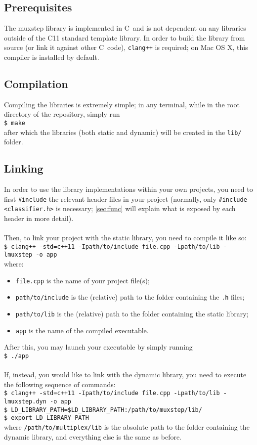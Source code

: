 \documentclass[12pt,openany]{article}
\def\CC{{C\nolinebreak[4]\hspace{-.05em}\raisebox{.4ex}{\tiny\bf ++}}}
\newcommand{\shellcmd}[1]{\\\indent\indent\texttt{\footnotesize\$ #1}}
\begin{document}
	\subsection{Prerequisites}
	The muxstep library is implemented in \CC\ and is not dependent on any libraries outside of the \CC11 standard template library. In order to build the library from source (or link it against other \CC\ code), {\tt clang++} is required; on Mac OS X, this compiler is installed by default.
	\subsection{Compilation}
	Compiling the libraries is extremely simple; in any terminal, while in the root directory of the repository, simply run
	\shellcmd{make}\\
	after which the libraries (both static and dynamic) will be created in the {\tt lib/} folder.
	\subsection{Linking}
	In order to use the library implementations within your own projects, you need to first {\tt \#include} the relevant header files in your project (normally, only {\tt \#include <classifier.h>} is necessary; \cref{sec:func} will explain what is exposed by each header in more detail).\\ \\
	Then, to link your project with the static library, you need to compile it like so:
	\shellcmd{clang++ -std=c++11 -Ipath/to/include file.cpp -Lpath/to/lib -lmuxstep -o app}\\
	where:
	\begin{itemize}
		\item {\tt file.cpp} is the name of your project file(s);
		\item {\tt path/to/include} is the (relative) path to the folder containing the {\tt .h} files;
		\item {\tt path/to/lib} is the (relative) path to the folder containing the static library;
		\item {\tt app} is the name of the compiled executable.
	\end{itemize}
	After this, you may launch your executable by simply running
	\shellcmd{./app}\\ \\
	If, instead, you would like to link with the dynamic library, you need to execute the following sequence of commands:
	\shellcmd{clang++ -std=c++11 -Ipath/to/include file.cpp -Lpath/to/lib -lmuxstep.dyn -o app}
	\shellcmd{LD\_LIBRARY\_PATH=\$LD\_LIBRARY\_PATH:/path/to/muxstep/lib/}
	\shellcmd{export LD\_LIBRARY\_PATH}\\
	where {\tt /path/to/multiplex/lib} is the absolute path to the folder containing the dynamic library, and everything else is the same as before.
\end{document}
